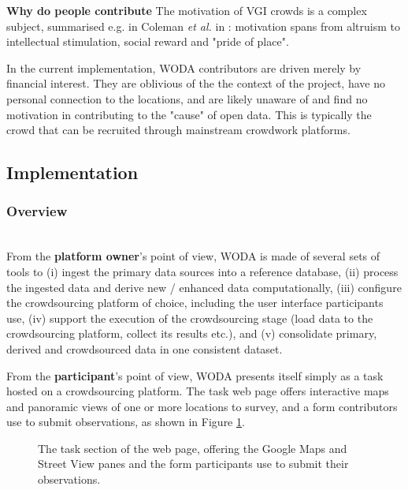 \textbf{Why do people contribute} The motivation of VGI crowds is a complex subject, summarised e.g. in Coleman {\it et al.} in \cite{Coleman:2009vd}: motivation spans from altruism to intellectual stimulation, social reward and "pride of place".

In the current implementation, WODA contributors are driven merely by financial interest. They are oblivious of the the context of the project, have no personal connection to the locations, and are likely unaware of and find no motivation in contributing to the "cause" of open data. This is typically the crowd that can be recruited through mainstream crowdwork platforms. 

\subsection{Implementation}

\subsubsection{Overview} \leavevmode \\ %

From the \textbf{platform owner}'s point of view, WODA is made of several sets of tools to (i) ingest the primary data sources into a reference database, (ii) process the ingested data and derive new / enhanced data computationally, (iii) configure the crowdsourcing platform of choice, including the user interface participants use, (iv) support the execution of the crowdsourcing stage (load data to the crowdsourcing platform, collect its results etc.), and (v) consolidate primary, derived and crowdsourced data in one consistent dataset.

From the \textbf{participant}'s point of view, WODA presents itself simply as a task hosted on a crowdsourcing platform. The task web page offers interactive maps and panoramic views of one or more locations to survey, and a form contributors use to submit observations, as shown in Figure \ref{fig:virtual-survey-tool-01}. 

\begin{figure}
	\caption{The task section of the web page, offering the Google Maps and Street View panes and the form participants use to submit their observations.}
	\label{fig:virtual-survey-tool-01}
\end{figure}

